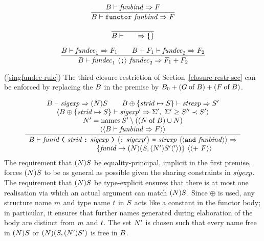 \begin{equation}        %
\label{singfundec-rule}
\frac{ \B\ts\funbind\ra\F }
     { \B\ts\singfundec\ra\F }\index{45.1}
\end{equation}

\vspace{6pt}
\begin{equation}        %
\frac{}
     { \B\ts\emptyfundec\ra\emptymap }
\end{equation}

\vspace{6pt}
\begin{equation}        %
\frac{ \B\ts\fundec_1\ra\F_1\qquad
       \B+\F_1\ts\fundec_2\ra\F_2 }
     { \B\ts\seqfundec\ra\plusmap{\F_1}{\F_2} }\index{45.1.5}
\end{equation}
\comments
\begin{description}
\item{(\ref{singfundec-rule})}
The third closure restriction of Section~\ref{closure-restr-sec}
can be enforced by replacing the $\B$ in the premise 
by $\B_0+(\of{\G}{\B})+(\of{\F}{\B})$.
\end{description}
\begin{equation}	%
\label{funbind-rule}
\frac{
      \begin{array}{c}
      \B\ts\sigexp\ra(\N)\S\qquad
      \B\oplus\{\strid\mapsto\S\} \ts\strexp\ra\S' \\
       \langle
      \B\oplus\{\strid\mapsto\S\} \ts\sigexp'\ra\sig',\ \sig'\geq\S''\prec\S'
       \rangle\\
      \N' = \NamesFcn\S'\setminus((\of{\N}{\B})\cup\N) \\
       \langle\langle\B\ts\funbind\ra\F\rangle\rangle
      \end{array}
     }
     {
      \begin{array}{c}
       \B\ts\funstrbinder\ \optfunbind\ra\\
       \qquad\qquad \qquad
              \{\funid\mapsto(\N)(\S,(\N')\S'\langle'\rangle)\}
              \ \langle\langle +\ \F\rangle\rangle
      \end{array}
     }\index{45.2}
\end{equation}
\comment The  requirement that $(\N)\S$ be equality-principal,
implicit in the first premise, forces $(\N)\S$ to be
as general as possible given the sharing constraints in $\sigexp$.
The requirement that $(\N)\S$ be type-explicit ensures that there is
at most one realisation via which an actual argument can match
$(\N)\S$.
Since $\oplus$ is used, any structure name $\m$ and type name $\t$ in
$\S$ acts like a constant in the functor body; in particular,
it ensures that further names generated during elaboration of the
body are distinct from $\m$ and $\t$. The set $\N'$ is
chosen such that every  name free
in $(\N)\S$ or $(\N)(\S,(\N')\S')$ is free in $\B$.

